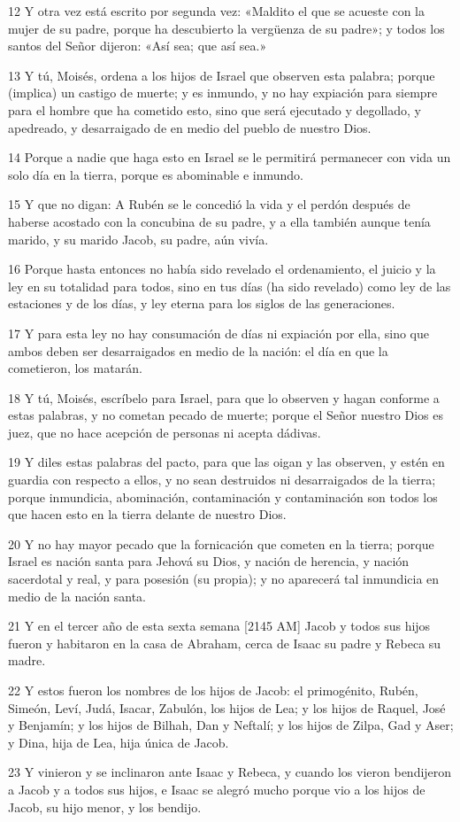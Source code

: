 \par 12 Y otra vez está escrito por segunda vez: «Maldito el que se acueste con la mujer de su padre, porque ha descubierto la vergüenza de su padre»; y todos los santos del Señor dijeron: «Así sea; que así sea.»
\par 13 Y tú, Moisés, ordena a los hijos de Israel que observen esta palabra; porque (implica) un castigo de muerte; y es inmundo, y no hay expiación para siempre para el hombre que ha cometido esto, sino que será ejecutado y degollado, y apedreado, y desarraigado de en medio del pueblo de nuestro Dios.
\par 14 Porque a nadie que haga esto en Israel se le permitirá permanecer con vida un solo día en la tierra, porque es abominable e inmundo.
\par 15 Y que no digan: A Rubén se le concedió la vida y el perdón después de haberse acostado con la concubina de su padre, y a ella también aunque tenía marido, y su marido Jacob, su padre, aún vivía.
\par 16 Porque hasta entonces no había sido revelado el ordenamiento, el juicio y la ley en su totalidad para todos, sino en tus días (ha sido revelado) como ley de las estaciones y de los días, y ley eterna para los siglos de las generaciones.
\par 17 Y para esta ley no hay consumación de días ni expiación por ella, sino que ambos deben ser desarraigados en medio de la nación: el día en que la cometieron, los matarán.
\par 18 Y tú, Moisés, escríbelo para Israel, para que lo observen y hagan conforme a estas palabras, y no cometan pecado de muerte; porque el Señor nuestro Dios es juez, que no hace acepción de personas ni acepta dádivas.
\par 19 Y diles estas palabras del pacto, para que las oigan y las observen, y estén en guardia con respecto a ellos, y no sean destruidos ni desarraigados de la tierra; porque inmundicia, abominación, contaminación y contaminación son todos los que hacen esto en la tierra delante de nuestro Dios.
\par 20 Y no hay mayor pecado que la fornicación que cometen en la tierra; porque Israel es nación santa para Jehová su Dios, y nación de herencia, y nación sacerdotal y real, y para posesión (su propia); y no aparecerá tal inmundicia en medio de la nación santa.
\par 21 Y en el tercer año de esta sexta semana [2145 AM] Jacob y todos sus hijos fueron y habitaron en la casa de Abraham, cerca de Isaac su padre y Rebeca su madre.
\par 22 Y estos fueron los nombres de los hijos de Jacob: el primogénito, Rubén, Simeón, Leví, Judá, Isacar, Zabulón, los hijos de Lea; y los hijos de Raquel, José y Benjamín; y los hijos de Bilhah, Dan y Neftalí; y los hijos de Zilpa, Gad y Aser; y Dina, hija de Lea, hija única de Jacob.
\par 23 Y vinieron y se inclinaron ante Isaac y Rebeca, y cuando los vieron bendijeron a Jacob y a todos sus hijos, e Isaac se alegró mucho porque vio a los hijos de Jacob, su hijo menor, y los bendijo.

